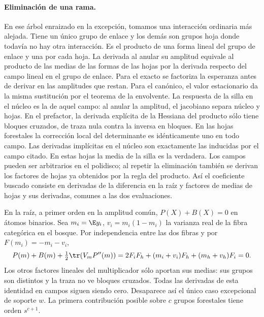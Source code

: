 \paragraph{Eliminación de una rama.}
En ese árbol enraizado en la excepción, tomamos una interacción ordinaria más alejada.
Tiene un único grupo de enlace y los demás son grupos hoja donde todavía no hay otra
interacción. Es el producto de una forma lineal del grupo de enlace y una por cada hoja.
La derivada al anular su amplitud equivale al producto de las medias de las formas
de las hojas por la derivada respecto del campo lineal en el grupo de enlace.
Para el exacto se factoriza la esperanza antes de derivar en las amplitudes que restan.
Para el canónico, el valor estacionario da la misma sustitución por el teorema de
la envolvente. La respuesta de la silla en el núcleo es la de aquel campo: al anular
la amplitud, el jacobiano separa núcleo y hojas. En el prefactor, la derivada explícita
de la Hessiana del producto sólo tiene bloques cruzados, de traza nula contra la inversa
en bloques. En las hojas forestales la corrección local del determinante es idénticamente
uno en todo campo. Las derivadas implícitas en el núcleo son exactamente las inducidas
por el campo citado. En estas hojas la media de la silla es la verdadera.
Los campos pueden ser arbitrarios en el polidisco; al repetir la eliminación también
se derivan los factores de hojas ya obtenidos por la regla del producto.
Así el coeficiente buscado consiste en derivadas de la diferencia en la raíz y factores
de medias de hojas y sus derivadas, comunes a las dos evaluaciones.

En la raíz, a primer orden en la amplitud común, $P(X)+B(X)=0$ en átomos binarios.
Sea $m_i=\E y_i$, $v_i=m_i(1-m_i)$ la varianza real de la fibra categórica en el
bosque. Por independencia entre las dos fibras y por $F(m_i)=-m_i-v_i$,
\[
 P(m)+B(m)+\tfrac12\tr(V_m P''(m))
 =2F_iF_h+(m_i+v_i)F_h+(m_h+v_h)F_i=0 .
\]
Los otros factores lineales del multiplicador sólo aportan sus medias: sus grupos
son distintos y la traza no ve bloques cruzados. Todas las derivadas de esta identidad
en campos siguen siendo cero. Desaparece así el único caso excepcional de soporte $w$.
La primera contribución posible sobre $c$ grupos forestales tiene orden $s^{c+1}$.
